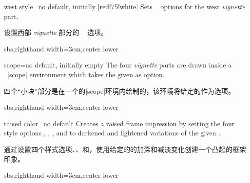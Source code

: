 \begin{vigTcbKey}[][doc new=2016-04-22]{west style}{=}{no default, initially |red!75!white|}
Sets \tikzname\  options for the west \emph{vignette} part.

设置西部 \emph{vignette} 部分的 \tikzname\  选项。
\begin{dispExample*}{sbs,righthand width=3cm,center lower}
\end{dispExample*}
\end{vigTcbKey}


\begin{vigTcbKey}[][doc new=2016-05-24]{scope}{=}{no default, initially empty}
The four \emph{vignette} parts are drawn inside a \tikzname\ |scope|
environment which takes the given  as option.

四个“小块”部分是在一个\tikzname 的|scope|环境内绘制的，该环境将给定的作为选项。
\begin{dispExample*}{sbs,righthand width=3cm,center lower}
\end{dispExample*}
\end{vigTcbKey}



\begin{vigTcbKey}[][doc new=2016-04-22]{raised color}{=}{no default}
Creates a raised frame impression by setting the four style options
,
,
, and
to darkened and lightened variations of the given .

通过设置四个样式选项、、和，使用给定的的加深和减淡变化创建一个凸起的框架印象。
\begin{dispExample*}{sbs,righthand width=3cm,center lower}
\end{dispExample*}
\end{vigTcbKey}


